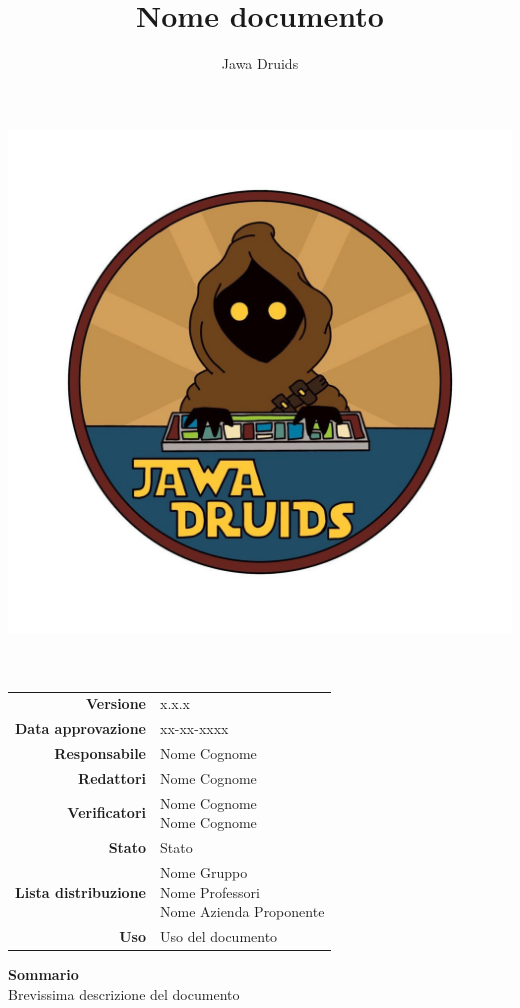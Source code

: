 




\makeatletter
\begin{titlepage}
	\begin{center}
		\vspace*{-5cm}
		\author{Jawa Druids} 
		\title{Nome documento}
		\date{} %
		\includegraphics[width=0.7\linewidth]{../immagini/DRUIDSLOGO.jpg}\\[4ex]
		{\huge \bfseries  \@title }\\[2ex] 
		{\LARGE  \@author}\\[50ex]
		\vspace*{-9cm}
		\begin{table}[H]
			\renewcommand{\arraystretch}{1.4}
			\centering
			\begin{tabular}{r | l}
				\textbf{Versione} & x.x.x \\%
				\textbf{Data approvazione} & xx-xx-xxxx\\
				\textbf{Responsabile} & Nome Cognome\\
				\textbf{Redattori} & Nome Cognome \\
				\textbf{Verificatori} & \makecell[tl]{Nome Cognome \\ Nome Cognome} \\
				\textbf{Stato} & Stato\\
				\textbf{Lista distribuzione} & \makecell[tl]{Nome Gruppo \\ Nome Professori \\ Nome Azienda Proponente}\\
				\textbf{Uso} & Uso del documento            
			\end{tabular}
		\end{table}
		\vspace{0.1cm}
		\hfill \break
		\fontsize{17}{10}\textbf{Sommario} \\
		\vspace{0.1cm}
		Brevissima descrizione del documento 
	\end{center}
\end{titlepage}
\makeatother

